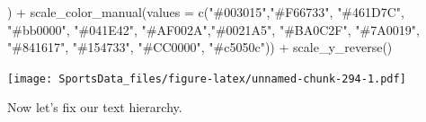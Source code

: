 \documentclass[
]{book}
\newenvironment{Shaded}{\begin{snugshade}}{\end{snugshade}}
\newcommand{\AttributeTok}[1]{\textcolor[rgb]{0.77,0.63,0.00}{#1}}
\newcommand{\FunctionTok}[1]{\textcolor[rgb]{0.00,0.00,0.00}{#1}}
\newcommand{\NormalTok}[1]{#1}
\newcommand{\SpecialCharTok}[1]{\textcolor[rgb]{0.00,0.00,0.00}{#1}}
\newcommand{\StringTok}[1]{\textcolor[rgb]{0.31,0.60,0.02}{#1}}
\begin{document}
\begin{Shaded}
\begin{Highlighting}[]
\NormalTok{    ) }\SpecialCharTok{+}
  \FunctionTok{scale\_color\_manual}\NormalTok{(}\AttributeTok{values =} \FunctionTok{c}\NormalTok{(}\StringTok{"\#003015"}\NormalTok{,}\StringTok{"\#F66733"}\NormalTok{, }\StringTok{"\#461D7C"}\NormalTok{, }\StringTok{"\#bb0000"}\NormalTok{, }\StringTok{"\#041E42"}\NormalTok{, }\StringTok{"\#AF002A"}\NormalTok{,}\StringTok{"\#0021A5"}\NormalTok{, }\StringTok{"\#BA0C2F"}\NormalTok{, }\StringTok{"\#7A0019"}\NormalTok{, }\StringTok{"\#841617"}\NormalTok{, }\StringTok{"\#154733"}\NormalTok{, }\StringTok{"\#CC0000"}\NormalTok{, }\StringTok{"\#c5050c"}\NormalTok{)) }\SpecialCharTok{+}
  \FunctionTok{scale\_y\_reverse}\NormalTok{() }
\end{Highlighting}
\end{Shaded}

\texttt{[image: SportsData\_files/figure-latex/unnamed-chunk-294-1.pdf]}

Now let's fix our text hierarchy.
\end{document}
